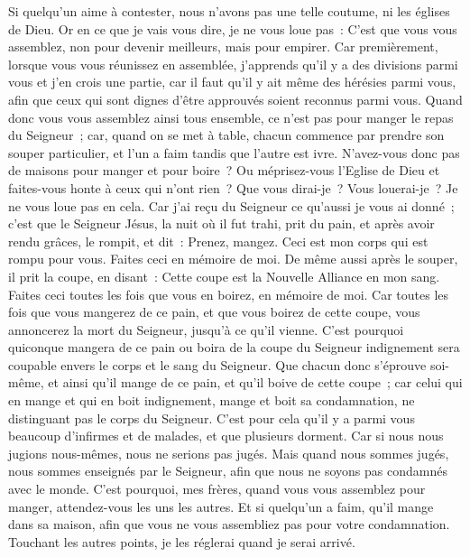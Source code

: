 \begin{multicols}{2}
Si quelqu'un aime à contester, nous n'avons pas une telle coutume, ni les églises de Dieu.
Or en ce que je vais vous dire, je ne vous loue pas~: C'est que vous vous assemblez, non pour devenir meilleurs, mais pour empirer.
Car premièrement, lorsque vous vous réunissez en assemblée, j'apprends qu'il y a des divisions parmi vous et j'en crois une partie,
car il faut qu'il y ait même des hérésies parmi vous, afin que ceux qui sont dignes d'être approuvés soient reconnus parmi vous.
Quand donc vous vous assemblez ainsi tous ensemble, ce n'est pas pour manger le repas du Seigneur~;
car, quand on se met à table, chacun commence par prendre son souper particulier, et l'un a faim tandis que l'autre est ivre.
N'avez-vous donc pas de maisons pour manger et pour boire~? Ou méprisez-vous l'Eglise de Dieu et faites-vous honte à ceux qui n'ont rien~? Que vous dirai-je~? Vous louerai-je~? Je ne vous loue pas en cela.
Car j'ai reçu du Seigneur ce qu'aussi je vous ai donné~; c'est que le Seigneur Jésus, la nuit où il fut trahi, prit du pain,
et après avoir rendu grâces, le rompit, et dit~: Prenez, mangez. Ceci est mon corps qui est rompu pour vous. Faites ceci en mémoire de moi.
De même aussi après le souper, il prit la coupe, en disant~: Cette coupe est la Nouvelle Alliance en mon sang. Faites ceci toutes les fois que vous en boirez, en mémoire de moi.
Car toutes les fois que vous mangerez de ce pain, et que vous boirez de cette coupe, vous annoncerez la mort du Seigneur, jusqu'à ce qu'il vienne.
C'est pourquoi quiconque mangera de ce pain ou boira de la coupe du Seigneur indignement sera coupable envers le corps et le sang du Seigneur.
Que chacun donc s'éprouve soi-même, et ainsi qu'il mange de ce pain, et qu'il boive de cette coupe~;
car celui qui en mange et qui en boit indignement, mange et boit sa condamnation, ne distinguant pas le corps du Seigneur.
C'est pour cela qu'il y a parmi vous beaucoup d'infirmes et de malades, et que plusieurs dorment.
Car si nous nous jugions nous-mêmes, nous ne serions pas jugés.
Mais quand nous sommes jugés, nous sommes enseignés par le Seigneur, afin que nous ne soyons pas condamnés avec le monde.
C'est pourquoi, mes frères, quand vous vous assemblez pour manger, attendez-vous les uns les autres.
Et si quelqu'un a faim, qu'il mange dans sa maison, afin que vous ne vous assembliez pas pour votre condamnation. Touchant les autres points, je les réglerai quand je serai arrivé.

\end{multicols}
